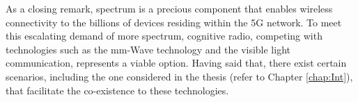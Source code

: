 As a closing remark, spectrum is a precious component that enables wireless connectivity to the billions of devices residing within the 5G network. To meet this escalating demand of more spectrum, cognitive radio, competing with technologies such as the mm-Wave technology and the visible light communication, represents a viable option. Having said that, there exist certain scenarios, including the one considered in the thesis (refer to Chapter \ref{chap:Int}), that facilitate the co-existence to these technologies. 







